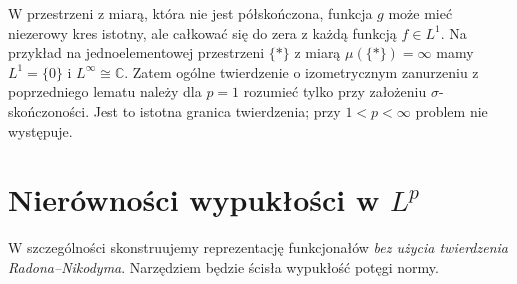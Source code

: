 \begin{uwaga}[Dlaczego wymagane jest doprecyzowanie dla $p=1$?]
W przestrzeni z miarą, która nie jest półskończona, funkcja $g$
może mieć niezerowy kres istotny, ale całkować się do zera
z każdą funkcją $f\in L^1$. Na przykład na jednoelementowej
przestrzeni $\{*\}$ z miarą $\mu(\{*\})=\infty$ mamy
$L^1=\{0\}$ i $L^\infty\cong\mathbb C$.
Zatem ogólne twierdzenie o izometrycznym zanurzeniu z poprzedniego
lematu należy dla $p=1$ rozumieć tylko przy założeniu
$\sigma$-skończoności. Jest to istotna granica twierdzenia;
przy $1<p<\infty$ problem nie występuje.
\end{uwaga}

\section{Nierówności wypukłości w $L^p$}
W szczególności skonstruujemy reprezentację funkcjonałów
\emph{bez użycia twierdzenia Radona--Nikodyma}. Narzędziem
będzie ścisła wypukłość potęgi normy.

